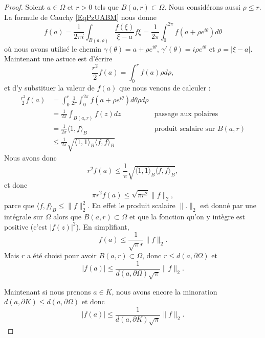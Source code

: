 \begin{proof}
	Soient \( a\in \Omega\) et \( r>0\) tels que \( B(a,r)\subset\Omega\). Nous considérons aussi \( \rho\leq r\). La formule de Cauchy \eqref{EqPzUABM} nous donne
	\begin{equation}
		f(a)=\frac{1}{ 2\pi i }\int_{B(a,\rho)}\frac{ f(\xi) }{ \xi-a }f\xi=\frac{1}{ 2\pi }\int_0^{2\pi}f(a+\rho e^{i\theta})d\theta
	\end{equation}
	où nous avons utilisé le chemin \( \gamma(\theta)=a+\rho e^{i\theta}\), \( \gamma'(\theta)=i\rho e^{i\theta}\) et \( \rho=| \xi-a |\). Maintenant une astuce est d'écrire
	\begin{equation}
		\frac{ r^2 }{2}f(a)=\int_0^rf(a)\rho d\rho,
	\end{equation}
	et d'y substituer la valeur de \( f(a)\) que nous venons de calculer :
	\begin{subequations}
		\begin{align}
			\frac{ r^2 }{2}f(a) & =\int_0^r\frac{1}{ 2\pi }\int_0^{2\pi}f(a+\rho e^{i\theta})d\theta\rho d\rho                                       \\
			                    & =\frac{1}{ 2\pi }\int_{B(a,r)}f(z)dz                                         & \text{passage aux polaires}         \\
			                    & =\frac{1}{ 2\pi }\langle 1, f\rangle_B                                       & \text{produit scalaire sur } B(a,r) \\
			                    & \leq\frac{1}{ 2\pi }\sqrt{\langle 1, 1\rangle_B\langle f, f\rangle_B }
		\end{align}
	\end{subequations}
	Nous avons donc
	\begin{equation}
		r^2f(a)\leq \frac{1}{ \pi }\sqrt{\langle 1, 1\rangle_B\langle f, f\rangle_B},
	\end{equation}
	et donc
	\begin{equation}
		\pi r^2 f(a)\leq \sqrt{\pi r^2}\| f \|_2,
	\end{equation}
	parce que \( \langle f, f\rangle_B\leq \| f \|_2^2\). En effet le produit scalaire \( \| . \|_2\) est donné par une intégrale sur \( \Omega\) alors que \( B(a,r)\subset \Omega\) et que la fonction qu'on y intègre est positive (c'est \( | f(z) |^2\)). En simplifiant,
	\begin{equation}
		f(a)\leq \frac{1}{ \sqrt{\pi}r }\| f \|_2.
	\end{equation}
	Mais \( r\) a été choisi pour avoir \( B(a,r)\subset\Omega\), donc \( r\leq d(a,\partial \Omega)\) et
	\begin{equation}
		| f(a) |\leq \frac{1}{ d(a,\partial\Omega)\sqrt{\pi} }\| f \|_2.
	\end{equation}

	Maintenant si nous prenons \( a\in K\), nous avons encore la minoration \( d(a,\partial K)\leq d(a,\partial \Omega)\) et donc
	\begin{equation}
		| f(a) |\leq\frac{1}{ d(a,\partial K)\sqrt{\pi} }\| f \|_2.
	\end{equation}

\end{proof}

